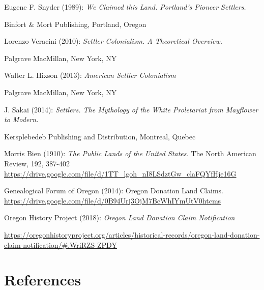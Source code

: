 \documentclass[
  12pt,
]{book}
\begin{document}
Eugene F. Snyder (1989): \emph{We Claimed this Land. Portland's Pioneer Settlers.}

Binfort \& Mort Publishing, Portland, Oregon

Lorenzo Veracini (2010): \emph{Settler Colonialism. A Theoretical Overview.}

Palgrave MacMillan, New York, NY

Walter L. Hixson (2013): \emph{American Settler Colonialism}

Palgrave MacMillan, New York, NY

J. Sakai (2014): \emph{Settlers. The Mythology of the White Proletariat from Mayflower to Modern.}

Kersplebedeb Publishing and Distribution, Montreal, Quebec

Morris Bien (1910): \emph{The Public Lands of the United States.} The North American Review, 192, 387-402 \href{https://drive.google.com/file/d/1TT_lgoh_nI8LSdztGw_claFQYfHje16G/view}{https://drive.google.com/file/d/1TT\_lgoh\_nI8LSdztGw\_claFQYfHje16G}

Genealogical Forum of Oregon (2014): Oregon Donation Land Claims. \url{https://drive.google.com/file/d/0B94Urj3OjM7BcWhIYmUtV0htcms}

Oregon History Project (2018): \emph{Oregon Land Donation Claim Notification}

\url{https://oregonhistoryproject.org/articles/historical-records/oregon-land-donation-claim-notification/\#.WriRZS-ZPDY}

\hypertarget{references-3}{%
\chapter{References}\label{references-3}}
\end{document}
